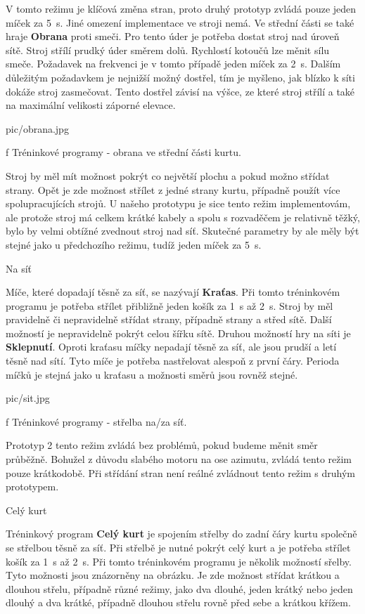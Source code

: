 V tomto režimu je klíčová změna stran, proto druhý prototyp zvládá pouze jeden míček za 5~s. Jiné omezení implementace ve stroji nemá.
\nl
\nl
Ve střední části se také hraje {\bf Obrana} proti smeči. Pro tento úder je potřeba dostat stroj nad úroveň sítě. Stroj střílí prudký úder směrem dolů. Rychlostí kotoučů lze měnit sílu smeče. Požadavek na frekvenci je v tomto případě jeden míček za 2~s. Dalším důležitým požadavkem je nejnižší možný dostřel, tím je myšleno, jak blízko k síti dokáže stroj zasmečovat. Tento dostřel závisí na výšce, ze které stroj střílí a také na maximální velikosti záporné elevace. 

\midinsert {}
\picheight=4cm \cinspic pic/obrana.jpg
\caption/f Tréninkové programy - obrana ve střední části kurtu.
\endinsert

Stroj by měl mít možnost pokrýt co největší plochu a pokud možno střídat strany. Opět je zde možnost střílet z jedné strany kurtu, případně použít více spolupracujících strojů. U našeho prototypu je sice tento režim implementovám, ale protože stroj má celkem krátké kabely a spolu s rozvaděčem je relativně těžký, bylo by velmi obtížné zvednout stroj nad síť. Skutečné parametry by ale měly být stejné jako u předchozího režimu, tudíž jeden míček za 5~s. 

 
\sec Na síť 

Míče, které dopadají těsně za síť, se nazývají {\bf Kraťas}. Při tomto tréninkovém programu je potřeba střílet přibližně jeden košík za 1~s až 2~s. Stroj by měl pravidelně či nepravidelně střídat strany, případně strany a střed sítě. Další možností je nepravidelně pokrýt celou šířku sítě. 
\nl
\nl
Druhou možností hry na síti je {\bf Sklepnutí}. Oproti kraťasu míčky nepadají těsně za síť, ale jsou prudší a letí těsně nad sítí. Tyto míče je potřeba nastřelovat alespoň z první čáry. Perioda míčků je stejná jako u kraťasu a možnosti směrů jsou rovněž stejné.
\nl

\midinsert {}
\picheight=4cm \cinspic pic/sit.jpg
\caption/f Tréninkové programy - střelba na/za síť.
\endinsert

Prototyp 2 tento režim zvládá bez problémů, pokud budeme měnit směr průběžně. Bohužel z důvodu slabého motoru na ose azimutu, zvládá tento režim pouze krátkodobě. Při střídání stran není reálné zvládnout tento režim s druhým prototypem. 

\sec Celý kurt

Tréninkový program {\bf Celý kurt} je spojením střelby do zadní čáry kurtu společně se střelbou těsně za síť. Při střelbě je nutné pokrýt celý kurt a je potřeba střílet košík za 1~s až 2~s. Při tomto tréninkovém programu je několik možností sřelby. Tyto možnosti jsou znázorněny na obrázku. Je zde možnost střídat krátkou a dlouhou střelu, případně různé režimy, jako dva dlouhé, jeden krátký nebo jeden dlouhý a dva krátké, případně dlouhou střelu rovně před sebe a krátkou křížem.

